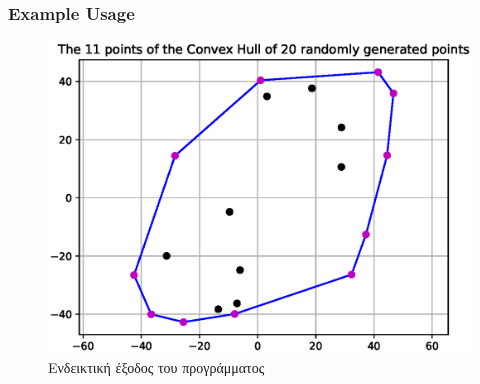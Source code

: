 \documentclass[12pt]{article}
\newenvironment{matlab}
	{\begin{figure}[H]\centering\captionsetup{justification=centering}}
	{\end{figure}}
\begin{document}
\subsubsection*{Example Usage}

\begin{matlab}
    \includegraphics[scale=1]{images/gift_wrapping_algorithm.eps}
    \caption{Ενδεικτική έξοδος του προγράμματος}
\end{matlab}

\pagebreak
\end{document}
